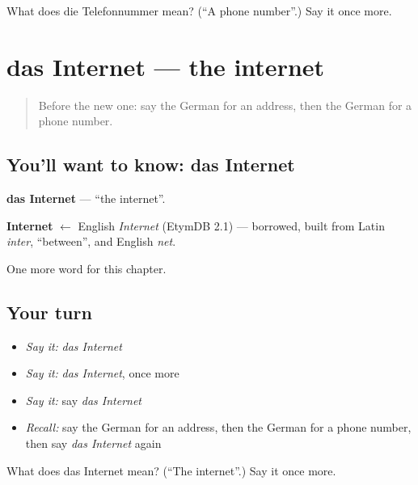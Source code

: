 \begin{tcolorbox}[breakable,colback=teal!4,colframe=teal!35!black,title={Before you move on}]
What does die Telefonnummer mean? (\textquotedblleft{}A phone number\textquotedblright{}.) Say it once more.
\end{tcolorbox}
\section[das Internet]{das Internet — the internet}

\label{lesson:GE-C159-internet}



\begin{quote}
Before the new one: say the German for an address, then the German for a phone number.
\end{quote}

\subsection*{You'll want to know: das Internet}
\textbf{das Internet} — \textquotedblleft{}the internet\textquotedblright{}.

\begin{cousinweb}
\textbf{Internet} $\leftarrow$ English \emph{Internet} (EtymDB 2.1) — borrowed, built from Latin \emph{inter}, \textquotedblleft{}between\textquotedblright{}, and English \emph{net}.
\end{cousinweb}

\begin{grammarlens}[title={What you've built}]
One more word for this chapter.
\end{grammarlens}

\subsection*{Your turn}
\begin{itemize}
\raggedright
  \item \emph{Say it:} \emph{das Internet}
  \item \emph{Say it:} \emph{das Internet}, once more
  \item \emph{Say it:} say \emph{das Internet}
  \item \emph{Recall:} say the German for an address, then the German for a phone number, then say \emph{das Internet} again
\end{itemize}

\begin{tcolorbox}[breakable,colback=teal!4,colframe=teal!35!black,title={Before you move on}]
What does das Internet mean? (\textquotedblleft{}The internet\textquotedblright{}.) Say it once more.
\end{tcolorbox}
